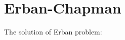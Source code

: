 \documentclass[
  a4paper,BCOR10mm,oneside,
  bibtotoc,idxtotoc,
  headsepline,footsepline,%
  fleqn,openbib
]{scrbook}
\begin{document}
\section{Erban-Chapman}\label{Erban-Chapmann}
The solution of Erban problem:

\end{document}
